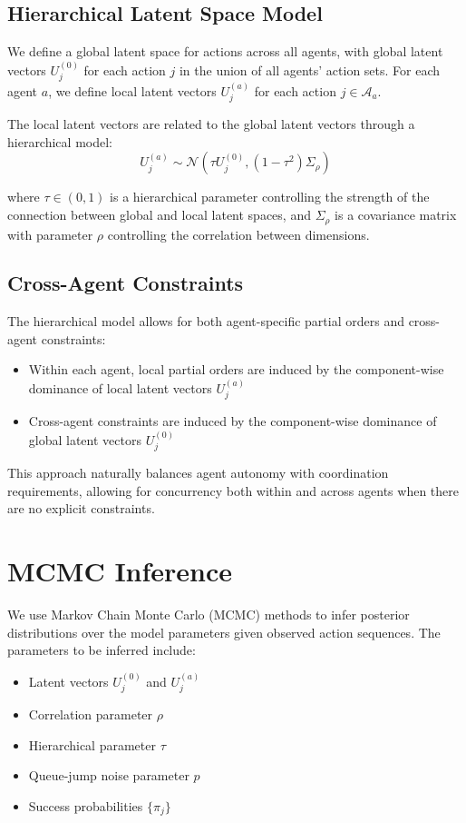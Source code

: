 \documentclass[twocolumn, 10pt]{article}
\begin{document}
\subsection{Hierarchical Latent Space Model}
We define a global latent space for actions across all agents, with global latent vectors $U^{(0)}_j$ for each action $j$ in the union of all agents' action sets. For each agent $a$, we define local latent vectors $U^{(a)}_j$ for each action $j \in \mathcal{A}_a$.

The local latent vectors are related to the global latent vectors through a hierarchical model:
\begin{equation}
U^{(a)}_j \sim \mathcal{N}(\tau U^{(0)}_j, (1-\tau^2)\Sigma_\rho)
\end{equation}

where $\tau \in (0, 1)$ is a hierarchical parameter controlling the strength of the connection between global and local latent spaces, and $\Sigma_\rho$ is a covariance matrix with parameter $\rho$ controlling the correlation between dimensions.

\subsection{Cross-Agent Constraints}
The hierarchical model allows for both agent-specific partial orders and cross-agent constraints:
\begin{itemize}
    \item Within each agent, local partial orders are induced by the component-wise dominance of local latent vectors $U^{(a)}_j$
    \item Cross-agent constraints are induced by the component-wise dominance of global latent vectors $U^{(0)}_j$
\end{itemize}

This approach naturally balances agent autonomy with coordination requirements, allowing for concurrency both within and across agents when there are no explicit constraints.

\section{MCMC Inference}
We use Markov Chain Monte Carlo (MCMC) methods to infer posterior distributions over the model parameters given observed action sequences. The parameters to be inferred include:
\begin{itemize}
    \item Latent vectors $U^{(0)}_j$ and $U^{(a)}_j$
    \item Correlation parameter $\rho$
    \item Hierarchical parameter $\tau$
    \item Queue-jump noise parameter $p$
    \item Success probabilities $\{\pi_j\}$
\end{itemize}
\end{document}
